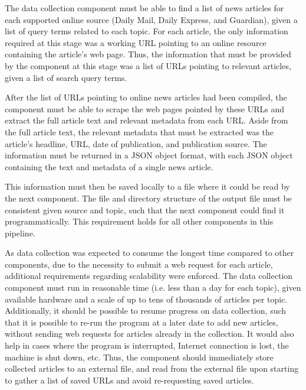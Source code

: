 \documentclass{report}
\begin{document}
The data collection component must be able to find a list of news articles for each supported online source (Daily Mail, Daily Express, and Guardian), given a list of query terms related to each topic.
For each article, the only information required at this stage was a working URL pointing to an online resource containing the article's web page.
Thus, the information that must be provided by the component at this stage was a list of URLs pointing to relevant articles, given a list of search query terms.

After the list of URLs pointing to online news articles had been compiled, the component must be able to scrape the web pages pointed by these URLs and extract the full article text and relevant metadata from each URL.
Aside from the full article text, the relevant metadata that must be extracted was the article's headline, URL, date of publication, and publication source.
The information must be returned in a JSON object format, with each JSON object containing the text and metadata of a single news article.

This information must then be saved locally to a file where it could be read by the next component. 
The file and directory structure of the output file must be consistent given source and topic, such that the next component could find it programmatically.
This requirement holds for all other components in this pipeline.

As data collection was expected to consume the longest time compared to other components, due to the necessity to submit a web request for each article, additional requirements regarding scalability were enforced.
The data collection component must run in reasonable time (i.e. less than a day for each topic), given available hardware and a scale of up to tens of thousands of articles per topic.
Additionally, it should be possible to resume progress on data collection, such that it is possible to re-run the program at a later date to add new articles, without sending web requests for articles already in the collection.
It would also help in cases where the program is interrupted, Internet connection is lost, the machine is shut down, etc.
Thus, the component should immediately store collected articles to an external file, and read from the external file upon starting to gather a list of saved URLs and avoid re-requesting saved articles.
\end{document}
